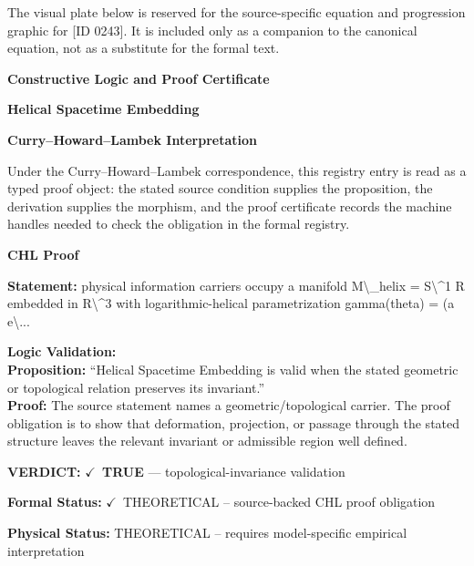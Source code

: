 \begingroup\footnotesize\sloppy
The visual plate below is reserved for the source-specific equation and progression graphic for [ID 0243]. It is included only as a companion to the canonical equation, not as a substitute for the formal text.
\par\endgroup
\ifTZPDarkEdition
{}
\fi

\clearpage
\begingroup\tzpsupportsetup
\noindent\textbf{\fontsize{10.8pt}{12.8pt}\selectfont [ID 0243] Constructive Logic and Proof Certificate}\par
\noindent\textbf{\fontsize{10pt}{12pt}\selectfont Helical Spacetime Embedding}\par
\vspace{0.45em}
\begingroup
\footnotesize
\setlength{\parskip}{0.22em}
\setlength{\parindent}{0pt}
\noindent\textbf{Curry--Howard--Lambek Interpretation}\par
Under the Curry--Howard--Lambek correspondence, this registry entry is read as a typed proof
object: the stated source condition supplies the proposition, the derivation supplies the
morphism, and the proof certificate records the machine handles needed to check the obligation
in the formal registry.

\vspace{0.45em}
\noindent\textbf{CHL Proof}\par
\textbf{Statement:} physical information carriers occupy a manifold M\textbackslash{}\_helix = S\textbackslash{}\textasciicircum{}1  R embedded in R\textbackslash{}\textasciicircum{}3
with logarithmic-helical parametrization gamma(theta) = (a e\textbackslash{}...

\textbf{Logic Validation:}\\
\textbf{Proposition:} ``Helical Spacetime Embedding is valid when the stated geometric or topological relation
preserves its invariant.''\\
\textbf{Proof:} The source statement names a geometric/topological carrier. The proof obligation is to
show that deformation, projection, or passage through the stated structure leaves the
relevant invariant or admissible region well defined.

\textbf{VERDICT:} \ensuremath{\checkmark}\ \textbf{TRUE} --- topological-invariance validation

\textbf{Formal Status:} \ensuremath{\checkmark}\ THEORETICAL -- source-backed CHL proof obligation

\textbf{Physical Status:} THEORETICAL -- requires model-specific empirical interpretation
\par\vspace{0.45em}
\par
\ifTZPDarkEdition
{}
\fi
\endgroup
\endgroup

